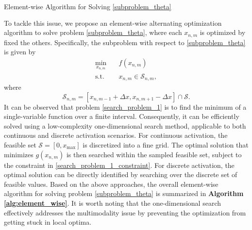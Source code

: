 \begin{algorithm}[tb]
    \caption{Element-wise Algorithm for Solving \eqref{subproblem_theta}}
    \label{alg:element_wise}
    \begin{algorithmic}[1]
        \REPEAT
            \ENDFOR
    \end{algorithmic}
\end{algorithm}

To tackle this issue, we propose an element-wise alternating optimization algorithm to solve problem \eqref{subproblem_theta}, where each $x_{n,m}$ is optimized by fixed the others. Specifically, the subproblem with respect to \eqref{subproblem_theta} is given by 
\begin{subequations} \label{search_problem_1}
    \begin{align}
        \min_{x_{n,m}} \quad & f(x_{n,m}) \\
        \label{search_problem_1_constraint}
        \mathrm{s.t.} \quad & x_{n,m} \in \mathcal{S}_{n,m},
    \end{align}
\end{subequations}
where 
\begin{equation} \label{search_set}
    \mathcal{S}_{n,m} = [x_{n,m-1}+\Delta x, x_{n,m+1} - \Delta x] \cap \mathcal{S}.
\end{equation}
It can be observed that problem \eqref{search_problem_1} is to find the minimum of a single-variable function over a finite interval. Consequently, it can be efficiently solved using a low-complexity one-dimensional search method, applicable to both continuous and discrete activation scenarios. For continuous activation, the feasible set $\mathcal{S} = [0, x_{\max}]$ is discretized into a fine grid. The optimal solution that minimizes $g(x_{n,m})$ is then searched within the sampled feasible set, subject to the constraint in \eqref{search_problem_1_constraint}. For discrete activation, the optimal solution can be directly identified by searching over the discrete set of feasible values. Based on the above approaches, the overall element-wise algorithm for solving problem \eqref{subproblem_theta} is summarized in \textbf{Algorithm \ref{alg:element_wise}}. It is worth noting that the one-dimensional search effectively addresses the multimodality issue by preventing the optimization from getting stuck in local optima.



